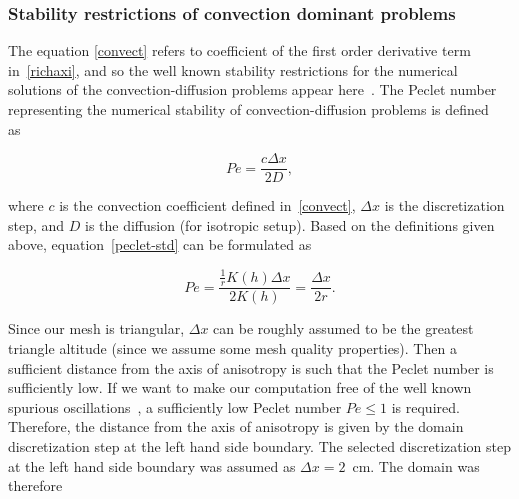 \documentclass[review,times,3p,10pt]{elsarticle}
\newenvironment{lineq}
    {\begin{linenomath*}
    \begin{equation}
    }
    { 
    \end{equation} 
    \end{linenomath*}
    }
\begin{document}
\subsubsection{Stability restrictions of convection dominant problems}
\label{restrconvect}

The equation \eqref{convect} refers to coefficient  of the first order derivative term in~\eqref{richaxi}, and so the well known stability restrictions for the numerical solutions of the convection-diffusion problems appear here~\cite{zienkiewicz1976}.
The Peclet number representing the numerical stability of convection-diffusion problems is defined as~\citep{knobloch2008} 
\begin{lineq}
\label{peclet-std}
Pe = \frac{c \Delta x}{2 D},
\end{lineq}
where $c$ is the convection coefficient defined in~\eqref{convect}, $\Delta x$ is the discretization step, and $D$ is the diffusion (for isotropic setup). Based on the definitions given above, equation~\eqref{peclet-std} can be formulated as
\begin{lineq}
\label{peclet-re}
Pe =  \frac{\frac{1}{r}K(h) \Delta x}{2K(h)} = \frac{\Delta x}{2r}.
\end{lineq}
Since our mesh is triangular, $\Delta x$ can be roughly assumed to be the greatest triangle altitude (since we assume some mesh quality properties). Then a sufficient distance from the axis of anisotropy is such that the Peclet number is sufficiently low. If we want to make our computation free of the well
  known spurious oscillations~\citep{zienkiewicz1976, roos-layers}, 
a sufficiently low Peclet number $Pe\le 1$ is required. Therefore, the distance from the axis of anisotropy is given by the domain discretization step at 
the left hand side boundary. The selected discretization step at the left hand side boundary was assumed as $\Delta x=2$~cm. The domain was therefore 
\end{document}
